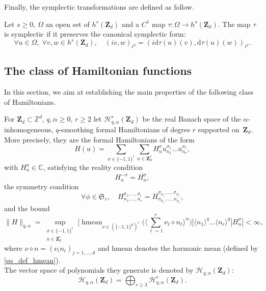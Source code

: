 Finally, the symplectic transformations are defined as follow.
\begin{definition}
\label{def_symplectic} Let $s\geq 0$, $\Omega$ an open set of $h^s(\mathbf{Z}_d)$ and a $C^1$ map $\tau: \Omega \to h^s(\mathbf{Z}_d) $. The map $\tau$ is symplectic if it preserves the canonical symplectic form:
\[
\forall u \in \Omega,\; \forall v,w \in h^s(\mathbf{Z}_d), \quad (iv,w)_{\ell^2} = (i\mathrm{d}\tau(u)(v),\mathrm{d}\tau(u)(w))_{\ell^2}.
\]
\end{definition}

\subsection{The class of Hamiltonian functions}
In this section, we aim at establishing the main properties of the following class of Hamiltonians.
\begin{definition}
\label{def_class_ham} For $\mathbf{Z}_d\subset \mathbb{Z}^d$, $q,\alpha\geq 0$, $r\geq 2$ let $\mathscr{H}_{q,\alpha}^{r}(\mathbf{Z}_d)$ be the real Banach space of the $\alpha$-inhomogeneous, $q$-smoothing formal Hamiltonians of degree $r$ supported on~$\mathbf{Z}_d$. More precisely, they are the formal Hamiltonians of the form
\[
H(u) = \sum_{\sigma \in \{-1,1\}^r} \sum_{n\in \mathbf{Z}_d^r } H_{n}^{\sigma} u_{n_1}^{\sigma_1} \dots u_{n_r}^{\sigma_r},
\]
with $H_{n}^{\sigma} \in \mathbb{C}$, satisfying the reality condition
\begin{equation}
\label{eq_def_real}
H_{n}^{-\sigma} = \overline{H_{n}^{\sigma}},
\end{equation}
the symmetry condition\vspace*{-3pt}
\begin{equation}
\label{def_sym_cond}
\forall \phi \in \mathfrak{S}_r, \quad H_{n_1,\dots,n_r}^{\sigma_1,\dots,\sigma_r} = H_{n_{\phi_1},\dots,n_{\phi_r}}^{\sigma_{\phi_1},\dots,\sigma_{\phi_r}},
\end{equation}
and the bound\vspace*{-3pt}
\begin{equation}
\label{eq_norm_ham}
\| H \|_{q,\alpha} = \! \! \! \sup_{\substack{\sigma \in \{-1,1\}^r\\ n\in \mathbf{Z}_d^r }}
\biggl[\mathop{\mathrm{hmean}}_{\nu \in (\{-1,1\}^d)^r} \Big(\Big\langle \sum_{\ell =1}^r \nu_{\ell} \diamond n_{\ell} \Big\rangle^{\alpha} \Big) \biggr] \langle n_1 \rangle^q \dots \langle n_r \rangle^q | H_{n}^{\sigma} | < \infty,
\end{equation}
where $\nu \diamond n =(\nu_i n_i)_{j=1,\dots,d}$ and $\mathrm{hmean}$ denotes the harmonic mean (defined by \eqref{eq_def_hmean}).\\
The vector space of polynomials they generate is denoted by $\mathscr{H}_{q,\alpha}(\mathbf{Z}_d)$:
\[
\mathscr{H}_{q,\alpha}(\mathbf{Z}_d) = \bigoplus_{r \geq 3} \mathscr{H}_{q,\alpha}^{r}(\mathbf{Z}_d).
\]
\end{definition}

